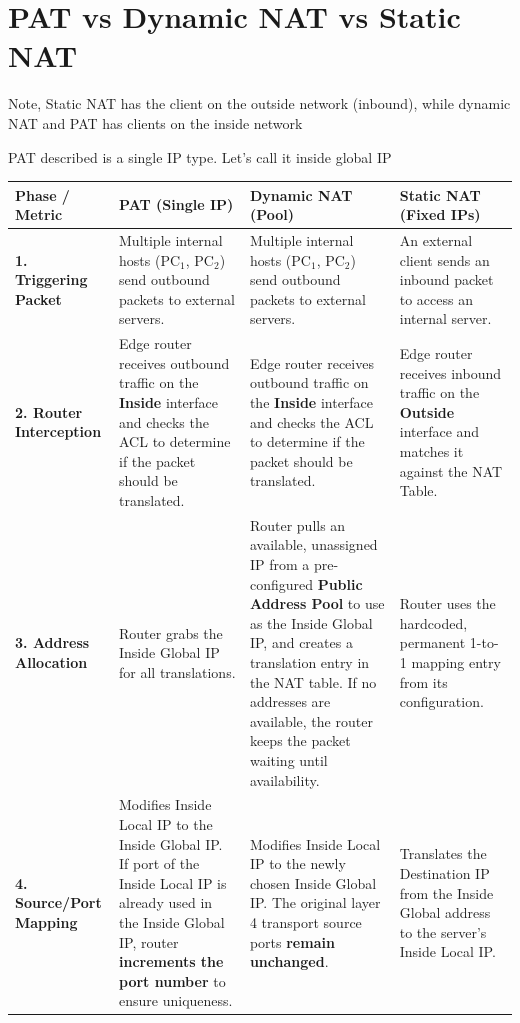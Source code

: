\documentclass{article}
\begin{document}
\section*{PAT vs Dynamic NAT vs Static NAT}

Note, Static NAT has the client on the outside network (inbound), while dynamic NAT and PAT has clients on the inside network

PAT described is a single IP type. Let's call it inside global IP

\begin{table}[h!]
\small
\centering
\begin{tabularx}{\textwidth}{l|Y|Y|Y}
\toprule
\textbf{Phase / Metric} & \textbf{PAT (Single IP)} & \textbf{Dynamic NAT (Pool)} & \textbf{Static NAT (Fixed IPs)} \\ 
\midrule

\textbf{1. Triggering Packet} & 
Multiple internal hosts ($\text{PC}_1$, $\text{PC}_2$) send outbound packets to external servers. & 
Multiple internal hosts ($\text{PC}_1$, $\text{PC}_2$) send outbound packets to external servers. & 
An external client sends an inbound packet to access an internal server. \\ 
\hline

\textbf{2. Router Interception} & 
Edge router receives outbound traffic on the \textbf{Inside} interface and checks the ACL to determine if the packet should be translated. & 
Edge router receives outbound traffic on the \textbf{Inside} interface and checks the ACL to determine if the packet should be translated. & 
Edge router receives inbound traffic on the \textbf{Outside} interface and matches it against the NAT Table. \\ 
\hline

\textbf{3. Address Allocation} & 
Router grabs the Inside Global IP for all translations. & 
Router pulls an available, unassigned IP from a pre-configured \textbf{Public Address Pool} to use as the Inside Global IP, and creates a translation entry in the NAT table. If no addresses are available, the router keeps the packet waiting until availability. & 
Router uses the hardcoded, permanent 1-to-1 mapping entry from its configuration. \\ 
\hline

\textbf{4. Source/Port Mapping} & 
Modifies Inside Local IP to the Inside Global IP. If port of the Inside Local IP is already used in the Inside Global IP, router \textbf{increments the port number} to ensure uniqueness. & 
Modifies Inside Local IP to the newly chosen Inside Global IP. The original layer 4 transport source ports \textbf{remain unchanged}. & 
Translates the Destination IP from the Inside Global address to the server's Inside Local IP. \\ 
\hline


\end{tabularx}
\end{table}
\end{document}
